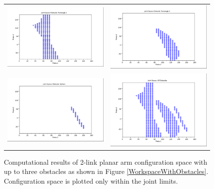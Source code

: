 \begin{figure}\centering
\begin{tabular}{cc}
\includegraphics[width=3.0in]{figs08/jobs_rect1.eps} &
\includegraphics[width=3.0in]{figs08/jobs_rect2.eps} \\
\includegraphics[width=3.0in]{figs08/jobs_sph.eps}   &
\includegraphics[width=3.0in]{figs08/jobs_all.eps}
\end{tabular}
\caption{Computational results of 2-link planar arm configuration space with up to three obstacles as shown in Figure \ref{WorkspaceWithObstacles}. Configuration space is plotted only within the joint limits.}\label{CspaceObs}
\end{figure}
 

